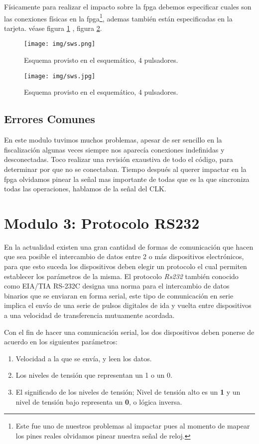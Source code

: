 \documentclass[a4paper]{article}
\begin{document}
Físicamente para realizar el impacto sobre la fpga debemos especificar cuales son las conexiones físicas en la fpga\footnote{Este fue uno de nuestros problemas al impactar pues al momento de mapear los pines reales olvidamos pinear nuestra señal de reloj.}, ademas también están especificadas en la tarjeta. véase figura \ref{Sw1} , figura \ref{Sw2}.
\begin{figure}[H]
  \centering
     \texttt{[image: img/sws.png]}
  \caption{Esquema provisto en el esquemático, 4 pulsadores.}
    \label{Sw1}
\end{figure}
\begin{figure}[H]
  \centering
     \texttt{[image: img/sws.jpg]}
  \caption{Esquema provisto en el esquemático, 4 pulsadores.}
    \label{Sw2}
\end{figure}

\subsection{Errores Comunes}
En este modulo tuvimos muchos problemas, apesar de ser sencillo en la fiscalización algunas veces siempre nos aparecía conexiones indefinidas y desconectadas. Toco realizar una revisión exaustiva de todo el código, para determinar por que no se conectaban.
Tiempo después al querer impactar en la fpga olvidamos pinear la señal mas importante de todas que es la que sincroniza todas las operaciones, hablamos de la señal del CLK. 

\clearpage
\newpage
\section{Modulo 3: Protocolo RS232 \label{comunicacion}}

En la actualidad existen una gran cantidad de formas de comunicación que hacen que sea posible el intercambio de datos entre 2 o más dispositivos electrónicos, para que esto suceda los dispositivos deben elegir un protocolo el cual permiten establecer los parámetros de la misma. El protocolo \emph{Rs232} también conocido como EIA/TIA RS-232C designa una norma para el intercambio de datos binarios que se enviaran en forma serial, este tipo de comunicación en serie implica el envío de una serie de pulsos digitales de ida y vuelta entre dispositivos a una velocidad de transferencia mutuamente acordada.

Con el fin de hacer una comunicación serial, los dos dispositivos deben ponerse de acuerdo en los siguientes parámetros:
\begin{enumerate}
\item Velocidad a la que se envía, y leen los datos.
\item Los niveles de tensión que representan un 1 o un 0.
\item El significado de los niveles de tensión; Nivel de tensión alto es un \textbf{1} y un nivel de  tensión bajo representa un \textbf{0}, o lógica inversa.
\end{enumerate}
\end{document}

